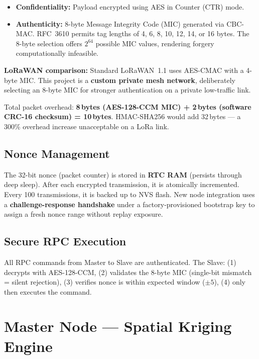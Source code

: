 \documentclass[12pt,a4paper]{article}
\begin{document}
\begin{itemize}
    \item \textbf{Confidentiality:} Payload encrypted using AES in Counter (CTR) mode.
    \item \textbf{Authenticity:} 8-byte Message Integrity Code (MIC) generated via CBC-MAC. RFC~3610 permits tag lengths of 4, 6, 8, 10, 12, 14, or 16 bytes. The 8-byte selection offers $2^{64}$ possible MIC values, rendering forgery computationally infeasible.
\end{itemize}

\begin{notebox}
\textbf{LoRaWAN comparison:} Standard LoRaWAN~1.1 uses AES-CMAC with a 4-byte MIC. This project is a \textbf{custom private mesh network}, deliberately selecting an 8-byte MIC for stronger authentication on a private low-traffic link.
\end{notebox}

Total packet overhead: \textbf{8\,bytes (AES-128-CCM MIC) + 2\,bytes (software CRC-16 checksum) = 10\,bytes}. HMAC-SHA256 would add 32\,bytes --- a 300\% overhead increase unacceptable on a LoRa link.

\subsection{Nonce Management}

The 32-bit nonce (packet counter) is stored in \textbf{RTC RAM} (persists through deep sleep). After each encrypted transmission, it is atomically incremented. Every 100 transmissions, it is backed up to NVS flash. New node integration uses a \textbf{challenge-response handshake} under a factory-provisioned bootstrap key to assign a fresh nonce range without replay exposure.

\subsection{Secure RPC Execution}

All RPC commands from Master to Slave are authenticated. The Slave: (1) decrypts with AES-128-CCM, (2) validates the 8-byte MIC (single-bit mismatch = silent rejection), (3) verifies nonce is within expected window ($\pm5$), (4) only then executes the command.

\section{Master Node --- Spatial Kriging Engine}
\end{document}
